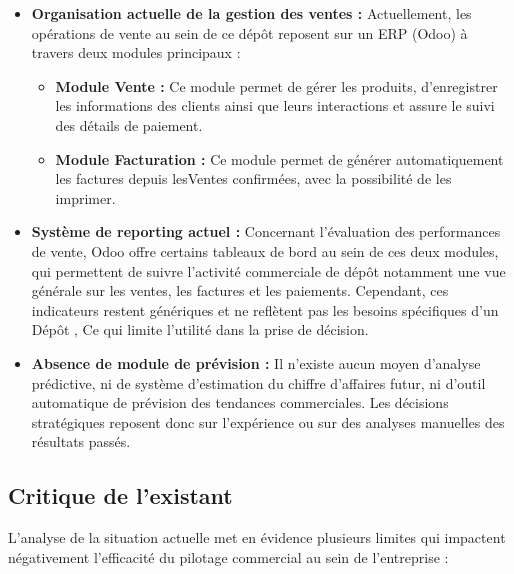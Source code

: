 \begin{itemize}[leftmargin=*, noitemsep]
    \item \textbf{Organisation actuelle de la gestion des ventes :}
    Actuellement, les opérations de vente au sein de ce dépôt reposent sur un ERP
    (Odoo) à travers deux modules principaux :
    \begin{itemize}[noitemsep]
        \item \textbf{Module Vente :} Ce module permet de gérer les produits,
        d'enregistrer les informations des clients ainsi que leurs interactions
        et assure le suivi des détails de paiement.
        \item \textbf{Module Facturation :} Ce module permet de générer
        automatiquement les factures depuis lesVentes confirmées, avec la
        possibilité de les imprimer.
    \end{itemize}

    \item \textbf{Système de reporting actuel :}
    Concernant l’évaluation des performances de vente, Odoo offre certains tableaux de bord au sein de ces deux modules, qui permettent de suivre l’activité commerciale de dépôt notamment une vue générale sur les ventes, les factures et les paiements.
    Cependant, ces indicateurs restent génériques et ne reflètent pas les besoins spécifiques d’un Dépôt , Ce qui limite l’utilité dans la prise de décision.


    \item \textbf{Absence de module de prévision :}
    Il n'existe aucun moyen d'analyse prédictive, ni de système d'estimation du
    chiffre d'affaires futur, ni d'outil automatique de prévision des tendances
    commerciales. Les décisions stratégiques reposent donc sur l'expérience ou
    sur des analyses manuelles des résultats passés.
\end{itemize}

\subsection{Critique de l'existant}

L'analyse de la situation actuelle met en évidence plusieurs limites qui impactent
négativement l'efficacité du pilotage commercial au sein de l'entreprise :

